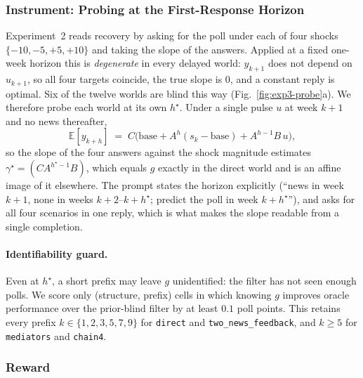 \subsubsection{Instrument: Probing at the First-Response Horizon}
\label{app:exp3-probe}

Experiment~2 reads recovery by asking for the poll under each of four shocks
$\{-10,-5,+5,+10\}$ and taking the slope of the answers. Applied at a fixed one-week horizon this is
\emph{degenerate} in every delayed world: $y_{k+1}$ does not depend on $u_{k+1}$, so all four targets
coincide, the true slope is $0$, and a constant reply is optimal. Six of the twelve worlds are blind this
way (Fig.~\ref{fig:exp3-probe}a). We therefore probe each world at its own $h^\star$. Under a single
pulse $u$ at week $k{+}1$ and no news thereafter,
\begin{equation}
\mathbb E[y_{k+h}] \;=\; C\Big(\text{base} + A^{h}(s_k-\text{base}) + A^{h-1} B\,u\Big),
\end{equation}
so the slope of the four answers against the shock magnitude estimates $\gamma^\star=(CA^{h^\star-1}B)$,
which equals $g$ exactly in the direct world and is an affine image of it elsewhere. The prompt states
the horizon explicitly (``news in week $k{+}1$, none in weeks $k{+}2$--$k{+}h^\star$; predict the poll in
week $k{+}h^\star$''), and asks for all four scenarios in one reply, which is what makes the slope
readable from a single completion.

\paragraph{Identifiability guard.}  Even at $h^\star$, a short prefix may leave $g$ unidentified: the
filter has not seen enough polls. We score only (structure, prefix) cells in which knowing $g$
improves oracle performance over the prior-blind filter by at least $0.1$ poll points.
This retains every prefix $k\in\{1,2,3,5,7,9\}$ for \texttt{direct} and \texttt{two\_news\_feedback}, and
$k\geq5$ for \texttt{mediators} and \texttt{chain4}.



\subsubsection{Reward}
\label{app:exp3-reward}

